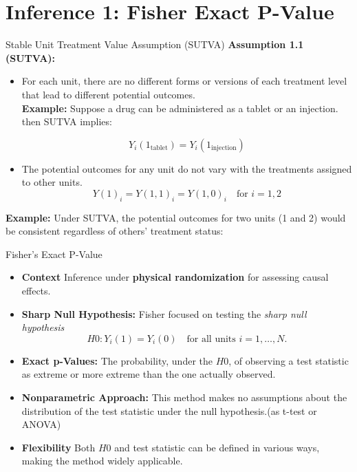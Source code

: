 \documentclass[xcolor=svgnames,t]{beamer}
\begin{document}
\section{Inference  1: Fisher Exact P-Value}
\begin{frame}{Stable Unit Treatment Value Assumption (SUTVA)}
    \textbf{Assumption 1.1 (SUTVA):}
    
    \begin{itemize}
        
        \item For each unit, there are no different forms or versions of each treatment level that lead to different potential outcomes.\\
        
        \pause
        \vspace{0.5cm}
        \textbf{Example:}  Suppose a drug can be administered as a tablet or an injection. then SUTVA implies:

    \[
    Y_i(1_{\text{tablet}}) = Y_i(1_{\text{injection}})
    \]
        \pause
        \item The potential outcomes for any unit do not vary with the treatments assigned to other units.
        \pause
        \[
            Y(1)_i = Y(1,1)_i = Y(1,0)_i \quad \text{for } i = 1, 2
            \]
        
    \end{itemize}

    \vspace{0.5cm}
    \textbf{Example:} Under SUTVA, the potential outcomes for two units (1 and 2) would be consistent regardless of others' treatment status:
    
  
    
    \vspace{1cm} %
\end{frame}

\begin{frame}{Fisher’s Exact P-Value}
    \begin{itemize}
        \item \textbf{Context} Inference under \textbf{physical randomization} for assessing causal effects.
        \pause
        \item \textbf{Sharp Null Hypothesis:} Fisher focused on testing the \emph{sharp null hypothesis} $$H0: Y_i(1) = Y_i(0) \quad \text{for all units } i = 1, \ldots, N. $$
        \pause
        \item \textbf{Exact p-Values:} The probability, under the $H0$, of observing a test statistic as extreme or more extreme than the one actually observed.
        \pause
        \item \textbf{Nonparametric Approach:} This method makes no assumptions about the distribution of the test statistic under the null hypothesis.(as t-test or ANOVA)
        \pause
        \item \textbf{Flexibility} Both $H0$ and test statistic can be defined in various ways, making the method widely applicable.
    \end{itemize}
\end{frame}
\end{document}
